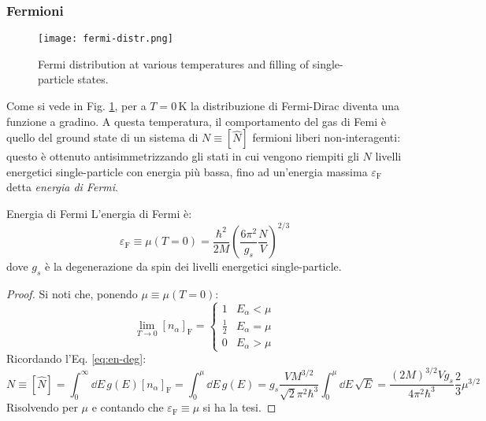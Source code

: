 \subsubsection{Fermioni}

\begin{figure}
	\centering
	\texttt{[image: fermi-distr.png]}
	\caption{Fermi distribution at various temperatures and filling of single-particle states.}
	\label{fermi-distr}
\end{figure}

Come si vede in Fig. \ref{fermi-distr}, per a $ T = 0 \,\text{K} $ la distribuzione di Fermi-Dirac diventa una funzione a gradino. A questa temperatura, il comportamento del gas di Femi è quello del ground state di un sistema di $ N \equiv [\hat{N}] $ fermioni liberi non-interagenti: questo è ottenuto antisimmetrizzando gli stati in cui vengono riempiti gli $ N $ livelli energetici single-particle con energia più bassa, fino ad un'energia massima $ \varepsilon_\text{F} $ detta \textit{energia di Fermi}.

\begin{theorem}{Energia di Fermi}{}
	L'energia di Fermi è:
	\begin{equation}
		\varepsilon_\text{F} \equiv \mu(T = 0) = \frac{\hbar^2}{2M} \left( \frac{6\pi^2}{g_s} \frac{N}{V} \right)^{2/3}
	\end{equation}
	dove $ g_s $ è la degenerazione da spin dei livelli energetici single-particle.

	\tcblower

	\begin{proof}
		Si noti che, ponendo $ \mu \equiv \mu(T = 0) $:
		\begin{equation*}
			\lim_{T \rightarrow 0} [n_\alpha]_\text{F} =
			\begin{cases}
				1 & E_\alpha < \mu \\
				\frac{1}{2} & E_\alpha = \mu \\
				0 & E_\alpha > \mu
			\end{cases}
		\end{equation*}
		Ricordando l'Eq. \ref{eq:en-deg}:
		\begin{equation*}
			N \equiv [\hat{N}] = \int_0^\infty \dd E\, g(E) [n_\alpha]_\text{F} = \int_0^\mu \dd E\, g(E) = g_s \frac{V M^{3/2}}{\sqrt{2} \pi^2 \hbar^3} \int_0^\mu \dd E\, \sqrt{E} = \frac{(2M)^{3/2} V g_s}{4\pi^2 \hbar^3} \frac{2}{3} \mu^{3/2}
		\end{equation*}
		Risolvendo per $ \mu $ e contando che $ \varepsilon_\text{F} \equiv \mu $ si ha la tesi.
	\end{proof}
\end{theorem}


